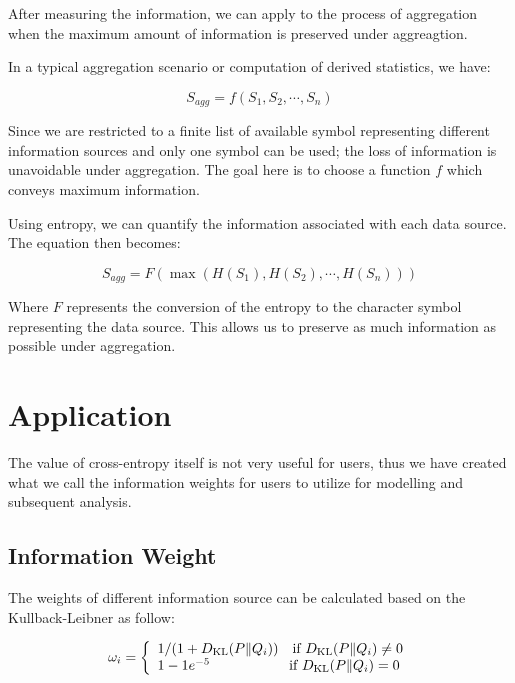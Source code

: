 \documentclass[nojss]{jss}
\begin{document}
After measuring the information, we can apply to the process of
aggregation when the maximum amount of information is preserved under
aggreagtion.

In a typical aggregation scenario or computation of derived
statistics, we have:

\begin{equation}
S_{agg} = f(S_{1}, S_{2}, \cdots, S_{n})
\end{equation}

Since we are restricted to a finite list of available symbol
representing different information sources and only one symbol can be
used; the loss of information is unavoidable under aggregation. The
goal here is to choose a function $f$ which conveys maximum
information.

Using entropy, we can quantify the information associated with each
data source. The equation then becomes:

\begin{equation}
S_{agg} = F(\max(H(S_{1}), H(S_{2}), \cdots, H(S_{n})))
\end{equation}

Where $F$ represents the conversion of the entropy to the character
symbol representing the data source. This allows us to preserve as
much information as possible under aggregation.


\section{Application}

The value of cross-entropy itself is not very useful for users, thus
we have created what we call the information weights for users to
utilize for modelling and subsequent analysis.

\subsection{Information Weight}
The weights of different information source can be calculated based on
the Kullback-Leibner as follow:

\begin{equation*}
  \omega_i = \left\{
  \begin{array}{l r}
    1/(1 + D_{\mathrm{KL}}(P\|Q_i)) \quad \text{if $D_{\mathrm{KL}}(P\|Q_i) \ne 0$}\\
    1 - 1e^{-5} \, \, \, \, \quad \quad \quad \quad \quad \text{if $D_{\mathrm{KL}}(P\|Q_i) = 0$}
  \end{array} \right.
\end{equation*}
\end{document}
